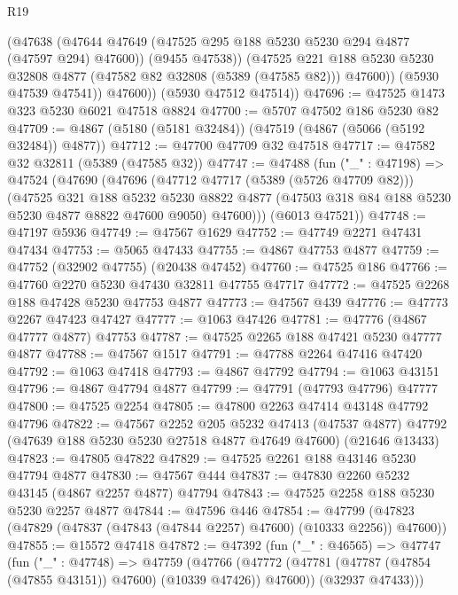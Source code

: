 \begin{lexlean}{R19}
\begin{coremodule}
              (@47638
                (@47644 @47649 (@47525 @295 @188 @5230 @5230 @294 @4877 (@47597 @294) @47600))
                (@9455 @47538))
              (@47525
                @221
                @188
                @5230
                @5230
                @32808
                @4877
                (@47582 @82 @32808 (@5389 (@47585 @82)))
                @47600))
            (@5930 @47539 @47541))
          @47600))
      (@5930 @47512 @47514))
@47696 := @47525 @1473 @323 @5230 @6021 @47518 @8824
@47700 := @5707 @47502 @186 @5230 @82
@47709 := @4867 (@5180 (@5181 @32484)) (@47519 (@4867 (@5066 (@5192 @32484)) @4877))
@47712 := @47700 @47709 @32 @47518
@47717 := @47582 @32 @32811 (@5389 (@47585 @32))
@47747 := @47488
    (fun ("_" : @47198) =>
    @47524
      (@47690
        (@47696
          (@47712 @47717 (@5389 (@5726 @47709 @82)))
          (@47525
            @321
            @188
            @5232
            @5230
            @8822
            @4877
            (@47503 @318 @84 @188 @5230 @5230 @4877 @8822 @47600 @9050)
            @47600)))
      (@6013 @47521))
@47748 := @47197 @5936
@47749 := @47567 @1629
@47752 := @47749 @2271 @47431 @47434
@47753 := @5065 @47433
@47755 := @4867 @47753 @4877
@47759 := @47752 (@32902 @47755) (@20438 @47452)
@47760 := @47525 @186
@47766 := @47760 @2270 @5230 @47430 @32811 @47755 @47717
@47772 := @47525 @2268 @188 @47428 @5230 @47753 @4877
@47773 := @47567 @439
@47776 := @47773 @2267 @47423 @47427
@47777 := @1063 @47426
@47781 := @47776 (@4867 @47777 @4877) @47753
@47787 := @47525 @2265 @188 @47421 @5230 @47777 @4877
@47788 := @47567 @1517
@47791 := @47788 @2264 @47416 @47420
@47792 := @1063 @47418
@47793 := @4867 @47792
@47794 := @1063 @43151
@47796 := @4867 @47794 @4877
@47799 := @47791 (@47793 @47796) @47777
@47800 := @47525 @2254
@47805 := @47800 @2263 @47414 @43148 @47792 @47796
@47822 := @47567
    @2252
    @205
    @5232
    @47413
    (@47537 @4877)
    @47792
    (@47639 @188 @5230 @5230 @27518 @4877 @47649 @47600)
    (@21646 @13433)
@47823 := @47805 @47822
@47829 := @47525 @2261 @188 @43146 @5230 @47794 @4877
@47830 := @47567 @444
@47837 := @47830 @2260 @5232 @43145 (@4867 @2257 @4877) @47794
@47843 := @47525 @2258 @188 @5230 @5230 @2257 @4877
@47844 := @47596 @446
@47854 := @47799 (@47823 (@47829 (@47837 (@47843 (@47844 @2257) @47600) (@10333 @2256)) @47600))
@47855 := @15572 @47418
@47872 := @47392
    (fun ("_" : @46565) =>
    @47747
      (fun ("_" : @47748) =>
      @47759
        (@47766 (@47772 (@47781 (@47787 (@47854 (@47855 @43151)) @47600) (@10339 @47426)) @47600))
        (@32937 @47433)))

\end{coremodule}
\end{lexlean}
